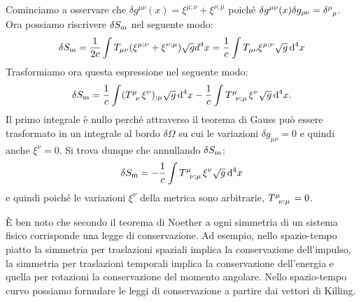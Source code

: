 Cominciamo a osservare che $\delta g^{\mu \nu}(x) = \xi^{\mu;\nu}+\xi^{\nu;\mu}$
poiché $\delta g^{\mu \nu}(x) \delta g_{\rho \nu} =
\tensor{\delta}{^{\mu}_{\rho}}$.  Ora possiamo riscrivere $\delta
S_{\textup{m}}$ nel seguente modo:
\begin{equation}
  \delta S_{\textup{m}} = \frac{1}{2c}\int T_{\mu \nu} (\xi^{\mu ;\nu} +
  \xi^{\nu;\mu}) \sqrt{g} d^4x = \frac{1}{c} \int T_{\mu \nu}  \xi^{\mu;\nu}
  \sqrt{g} \mathop{}\!\mathrm{d}^4x
\end{equation}
Trasformiamo ora questa espressione nel seguente modo:
\begin{equation}
  \delta S_{\textup{m}} = \frac{1}{c} \int (\tensor{T}{^{\mu}_{\nu}}  \xi^{\nu})_{;\mu}
  \sqrt{g} \dd^4x - \frac{1}{c} \int \tensor{T}{^{\mu}_{\nu; \mu}} \xi^{\nu}
  \sqrt{g} \dd^4x.
\end{equation}
Il primo integrale è nullo perché attraverso il teorema di Gauss può essere
trasformato in un integrale al bordo $\delta \Omega$ su cui le variazioni
$\delta g_{\mu \nu}=0$ e quindi anche $\xi^{\nu}=0$.  Si trova dunque che
annullando $\delta S_{\textup{m}}$:
\begin{equation}
  \delta S_{\textup{m}} = - \frac{1}{c} \int \tensor{T}{^{\mu}_{\nu; \mu}}
  \xi^{\nu} \sqrt{g} \dd^4x
\end{equation}
e quindi poiché le variazioni $\xi^{\nu}$ della metrica sono arbitrarie,
$\tensor{T}{^{\mu}_{\nu:\mu}}=0$.

È ben noto che secondo il teorema di Noether a ogni simmetria di un sistema
fisico corrisponde una legge di conservazione.  Ad esempio, nello spazio-tempo
piatto la simmetria per traslazioni spaziali implica la conservazione
dell'impulso, la simmetria per traslazioni temporali implica la conservazione
dell'energia e quella per rotazioni la conservazione del momento angolare.
Nello spazio-tempo curvo possiamo formulare le leggi di conservazione a partire
dai vettori di Killing.

